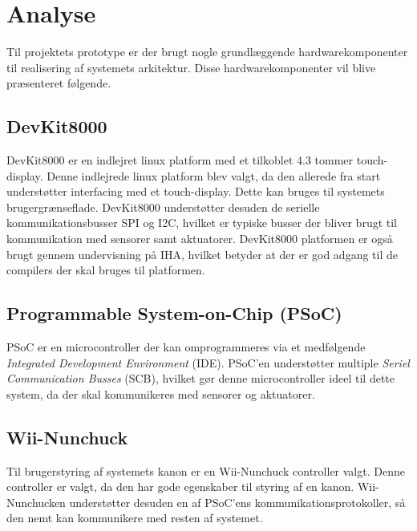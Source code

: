 \chapter{Analyse}
\label{afsnit:analyse}
Til projektets prototype er der brugt nogle grundlæggende hardwarekomponenter til realisering af systemets arkitektur. Disse hardwarekomponenter vil blive præsenteret følgende.

\section{DevKit8000}
DevKit8000 er en indlejret linux platform med et tilkoblet 4.3 tommer touch-display. Denne indlejrede linux platform blev valgt, da den allerede fra start understøtter interfacing med et touch-display. Dette kan bruges til systemets brugergrænseflade. DevKit8000 understøtter desuden de serielle kommunikationsbusser SPI og I2C, hvilket er typiske busser der bliver brugt til kommunikation med sensorer samt aktuatorer. \newline 
\noindent DevKit8000 platformen er også brugt gennem undervisning på IHA, hvilket betyder at der er god adgang til de compilers der skal bruges til platformen.

\section{Programmable System-on-Chip (PSoC)}
PSoC er en microcontroller der kan omprogrammeres via et medfølgende \textit{Integrated Development Environment} (IDE). PSoC'en understøtter multiple \textit{Seriel Communication Busses} (SCB), hvilket gør denne microcontroller ideel til dette system, da der skal kommunikeres med sensorer og aktuatorer.

\section{Wii-Nunchuck}
Til brugerstyring af systemets kanon er en Wii-Nunchuck controller valgt. Denne controller er valgt, da den har gode egenskaber til styring af en kanon. Wii-Nunchucken understøtter desuden en af PSoC'ens kommunikationsprotokoller, så den nemt kan kommunikere med resten af systemet.

